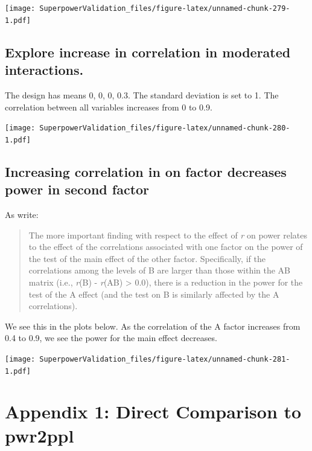 \documentclass[
]{book}
\begin{document}
\texttt{[image: SuperpowerValidation\_files/figure-latex/unnamed-chunk-279-1.pdf]}
\pagebreak

\hypertarget{explore-increase-in-correlation-in-moderated-interactions.}{%
\section{Explore increase in correlation in moderated interactions.}\label{explore-increase-in-correlation-in-moderated-interactions.}}

The design has means 0, 0, 0, 0.3. The standard deviation is set to 1. The correlation between all variables increases from 0 to 0.9.

\texttt{[image: SuperpowerValidation\_files/figure-latex/unnamed-chunk-280-1.pdf]}
\pagebreak

\hypertarget{increasing-correlation-in-on-factor-decreases-power-in-second-factor}{%
\section{Increasing correlation in on factor decreases power in second factor}\label{increasing-correlation-in-on-factor-decreases-power-in-second-factor}}

As \citet{potvin2000statistical} write:

\begin{quote}
The more important finding with respect to the effect of \emph{r} on power relates to the effect of the correlations associated with one factor on the power of the test of the main effect of the other factor. Specifically, if the correlations among the levels of B are larger than those within the AB matrix (i.e., \emph{r}(B) - \emph{r}(AB) \textgreater{} 0.0), there is a reduction in the power for the test of the A effect (and the test on B is similarly affected by the A correlations).
\end{quote}

We see this in the plots below. As the correlation of the A factor increases from 0.4 to 0.9, we see the power for the main effect decreases.

\texttt{[image: SuperpowerValidation\_files/figure-latex/unnamed-chunk-281-1.pdf]}

\hypertarget{appendix-1-direct-comparison-to-pwr2ppl}{%
\chapter*{Appendix 1: Direct Comparison to pwr2ppl}\label{appendix-1-direct-comparison-to-pwr2ppl}}
\end{document}
